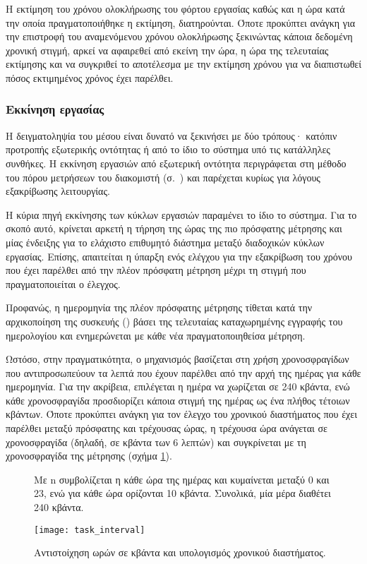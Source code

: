 Η εκτίμηση του χρόνου ολοκλήρωσης του φόρτου εργασίας καθώς και η ώρα κατά την
οποία πραγματοποιήθηκε η εκτίμηση, διατηρούνται. Όποτε προκύπτει ανάγκη για την
επιστροφή του αναμενόμενου χρόνου ολοκλήρωσης ξεκινώντας κάποια δεδομένη χρονική
στιγμή, αρκεί να αφαιρεθεί από εκείνη την ώρα, η ώρα της τελευταίας εκτίμησης
και να συγκριθεί το αποτέλεσμα με την εκτίμηση χρόνου για να διαπιστωθεί πόσος
εκτιμημένος χρόνος έχει παρέλθει.


\subsubsection{Εκκίνηση εργασίας}
\label{ssubsec:task:initiate}

Η δειγματοληψία του μέσου είναι δυνατό να ξεκινήσει με δύο τρόπους· κατόπιν
προτροπής εξωτερικής οντότητας ή από το ίδιο το σύστημα υπό τις κατάλληλες
συνθήκες. Η εκκίνηση εργασιών από εξωτερική οντότητα περιγράφεται στη μέθοδο
 του πόρου μετρήσεων του διακομιστή
(σ.~\pageref{ssubsec:network:measurement-post}) και παρέχεται κυρίως για λόγους
εξακρίβωσης λειτουργίας.

Η κύρια πηγή εκκίνησης των κύκλων εργασιών παραμένει το ίδιο το σύστημα.
Για το σκοπό αυτό, κρίνεται
αρκετή η τήρηση της ώρας της πιο πρόσφατης μέτρησης και μίας ένδειξης για το
ελάχιστο επιθυμητό διάστημα μεταξύ διαδοχικών κύκλων εργασίας. Επίσης,
απαιτείται η ύπαρξη ενός ελέγχου για την εξακρίβωση του χρόνου που έχει παρέλθει
από την πλέον πρόσφατη μέτρηση μέχρι τη στιγμή που πραγματοποιείται ο έλεγχος.

Προφανώς, η ημερομηνία της πλέον πρόσφατης μέτρησης τίθεται κατά την
αρχικοποίηση της συσκευής () βάσει της τελευταίας καταχωρημένης
εγγραφής του ημερολογίου και ενημερώνεται με κάθε νέα πραγματοποιηθείσα μέτρηση.

Ωστόσο, στην πραγματικότητα, ο μηχανισμός βασίζεται στη χρήση χρονοσφραγίδων που
αντιπροσωπεύουν τα λεπτά που έχουν παρέλθει από την αρχή της ημέρας για κάθε
ημερομηνία. Για την ακρίβεια, επιλέγεται η ημέρα να χωρίζεται σε 240 κβάντα, ενώ
κάθε χρονοσφραγίδα προσδιορίζει κάποια στιγμή της ημέρας ως ένα πλήθος τέτοιων
κβάντων. Όποτε προκύπτει ανάγκη για τον έλεγχο του χρονικού διαστήματος που έχει
παρέλθει μεταξύ πρόσφατης και τρέχουσας ώρας, η τρέχουσα ώρα ανάγεται σε
χρονοσφραγίδα (δηλαδή, σε κβάντα των 6 λεπτών) και συγκρίνεται με τη
χρονοσφραγίδα της μέτρησης (σχήμα \ref{fig:task:interval}).

\begin{figure}
    \caption{Αντιστοίχηση ωρών σε κβάντα και υπολογισμός χρονικού διαστήματος.
    \label{fig:task:interval}}
    Με n συμβολίζεται η κάθε ώρα της ημέρας και κυμαίνεται μεταξύ 0 και 23, ενώ
    για κάθε ώρα ορίζονται 10 κβάντα. Συνολικά, μία μέρα διαθέτει 240 κβάντα.
    \begin{center}
    \texttt{[image: task\_interval]}
    \end{center}
\end{figure}

